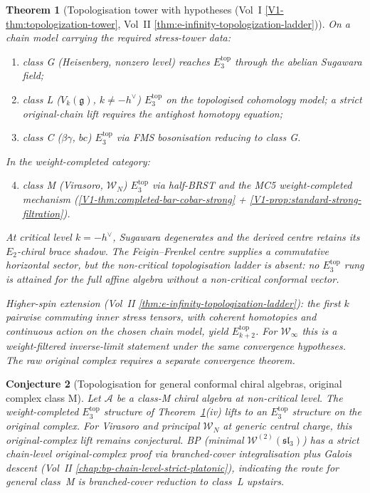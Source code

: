 \documentclass[11pt]{article}
\newtheorem{theorem}{Theorem}[section]
\newtheorem{conjecture}[theorem]{Conjecture}
\theoremstyle{remark}
\providecommand{\cA}{\mathcal{A}}
\providecommand{\cW}{\mathcal{W}}
\providecommand{\fg}{\mathfrak{g}}
\providecommand{\fsl}{\mathfrak{sl}}
\begin{document}
\begin{theorem}[Topologisation tower with hypotheses (Vol~I
\ref*{V1-thm:topologization-tower},
Vol~II \ref*{thm:e-infinity-topologization-ladder})]%
\label{thm:topologisation-tower-standalone}%
On a chain model carrying the required stress-tower data:
\begin{enumerate}[label=\textup{(\roman*)}]
\item class G (Heisenberg, nonzero level) reaches $E_3^{\mathrm{top}}$
  through the abelian Sugawara field;
\item class L ($V_k(\fg)$, $k \ne -h^\vee$) $E_3^{\mathrm{top}}$
  on the topologised cohomology model; a strict original-chain lift
  requires the antighost homotopy equation;
\item class C ($\beta\gamma$, $bc$) $E_3^{\mathrm{top}}$ via FMS
  bosonisation reducing to class G.
\end{enumerate}
In the weight-completed category:
\begin{enumerate}[label=\textup{(\roman*)}]\setcounter{enumi}{3}
\item class M (Virasoro, $\cW_N$) $E_3^{\mathrm{top}}$ via half-BRST
  and the MC5 weight-completed mechanism
  (\ref*{V1-thm:completed-bar-cobar-strong}
  + \ref*{V1-prop:standard-strong-filtration}).
\end{enumerate}
At critical level $k = -h^\vee$, Sugawara degenerates and the
derived centre retains its $E_2$-chiral brace shadow. The
Feigin--Frenkel centre supplies a commutative horizontal sector, but
the non-critical topologisation ladder is absent: no
$E_3^{\mathrm{top}}$ rung is attained for the full affine algebra
without a non-critical conformal vector.

\noindent
Higher-spin extension (Vol~II
\ref*{thm:e-infinity-topologization-ladder}): the first $k$ pairwise
commuting inner stress tensors, with coherent homotopies and continuous
action on the chosen chain model, yield $E_{k+2}^{\mathrm{top}}$.
For $\cW_\infty$ this is a weight-filtered inverse-limit statement under
the same convergence hypotheses. The raw original complex requires a
separate convergence theorem.
\end{theorem}

\begin{conjecture}[Topologisation for general conformal chiral
algebras, original complex class M]%
\label{conj:topologise-general}%
Let $\cA$ be a class-M chiral algebra at non-critical level. The
weight-completed $E_3^{\mathrm{top}}$ structure of
Theorem~\ref{thm:topologisation-tower-standalone}(iv) lifts to an
$E_3^{\mathrm{top}}$ structure on the original complex. For
Virasoro and principal $\cW_N$ at generic central charge, this
original-complex lift remains conjectural. BP (minimal
$\cW^{(2)}(\fsl_3)$) has a strict chain-level original-complex proof via branched-cover
integralisation plus Galois descent (Vol~II
\ref*{chap:bp-chain-level-strict-platonic}), indicating the route
for general class~M is branched-cover reduction to class~L upstairs.
\end{conjecture}
\end{document}
